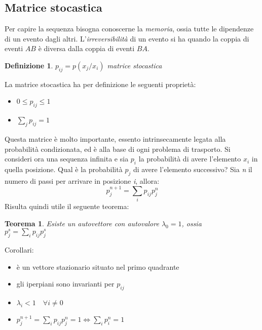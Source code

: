 \documentclass[12pt, a4paper]{book}
\theoremstyle{theorem}
\newtheorem{definition}{Definizione}[section]
\newtheorem{theorem}{Teorema}[section]
\begin{document}
			\subsection{Matrice stocastica}
				Per capire la sequenza bisogna conoscerne la \textit{memoria}, ossia tutte le dipendenze di un evento dagli altri.
				L'\textit{irreversibilità} di un evento si ha quando la coppia di eventi $AB$ è diversa dalla coppia di eventi $BA$.
				\begin{definition}
					$p_{ij}=p(x_j/x_i)$ matrice stocastica
				\end{definition}
				La matrice stocastica ha per definizione le seguenti proprietà:
				\begin{itemize}
					\item $0\leq p_{ij}\leq 1$
					\item $\sum_jp_{ij}=1$
				\end{itemize}
				Questa matrice è molto importante, essento intrinsecamente legata alla probabilità condizionata, ed è alla base di ogni problema di trasporto.
				Si consideri ora una sequenza infinita e sia $p_i$ la probabilità di avere l'elemento $x_i$ in quella posizione.
				Qual è la probabilità $p_j$ di avere l'elemento successivo?
				Sia \textit{n} il numero di passi per arrivare in posizione \textit{i}, allora:
				\begin{equation}
					p_j^{n+1}=\sum_ip_{ij}p_j^n
				\end{equation}
				Risulta quindi utile il seguente teorema:
				\begin{theorem}
					Esiste un autovettore con autovalore $\lambda_0=1$, ossia\\
					$p_j^s=\sum_ip_{ij}p_j^s$
				\end{theorem}
				Corollari:
				\begin{itemize}
					\item è un vettore stazionario situato nel primo quadrante
					\item gli iperpiani sono invarianti per $p_{ij}$
					\item $\lambda_i<1\quad\forall i\neq 0$
					\item $p_j^{n+1}=\sum_ip_{ij}p_j^n=1\Leftrightarrow\sum_ip_i^n=1$
				\end{itemize}
		
\end{document}
